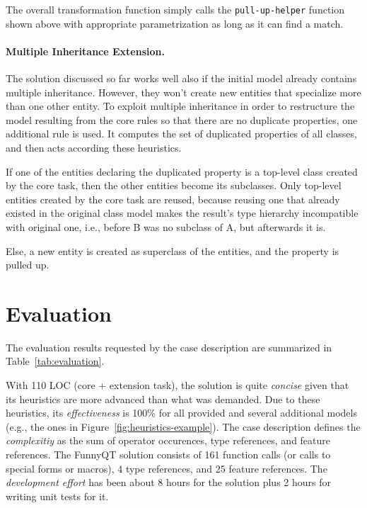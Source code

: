 \documentclass[submission]{eptcs}
\begin{document}
The overall transformation function simply calls the \verb|pull-up-helper|
function shown above with appropriate parametrization as long as it can find a
match.


\paragraph{Multiple Inheritance Extension.}

The solution discussed so far works well also if the initial model already
contains multiple inheritance.  However, they won't create new entities that
specialize more than one other entity.  To exploit multiple inheritance in
order to restructure the model resulting from the core rules so that there are
no duplicate properties, one additional rule is used.  It computes the set of
duplicated properties of all classes, and then acts according these heuristics.
\begin{compactenum}
\item If one of the entities declaring the duplicated property is a top-level
  class created by the core task, then the other entities become its
  subclasses.  Only top-level entities created by the core task are reused,
  because reusing one that already existed in the original class model makes
  the result's type hierarchy incompatible with original one, i.e., before B
  was no subclass of A, but afterwards it is.
\item Else, a new entity is created as superclass of the entities, and the
  property is pulled up.
\end{compactenum}


\section{Evaluation}
\label{sec:evaluation}

The evaluation results requested by the case description
\cite{cdrestructcasedesc} are summarized in Table~\ref{tab:evaluation}.

With 110 LOC (core + extension task), the solution is quite \emph{concise}
given that its heuristics are more advanced than what was demanded.  Due to
these heuristics, its \emph{effectiveness} is 100\% for all provided and
several additional models (e.g., the ones in
Figure~\ref{fig:heuristics-example}).  The case description defines the
\emph{complexitiy} as the sum of operator occurences, type references, and
feature references.  The FunnyQT solution consists of 161 function calls (or
calls to special forms or macros), 4 type references, and 25 feature
references.  The \emph{development effort} has been about 8 hours for the
solution plus 2 hours for writing unit tests for it.
\end{document}
